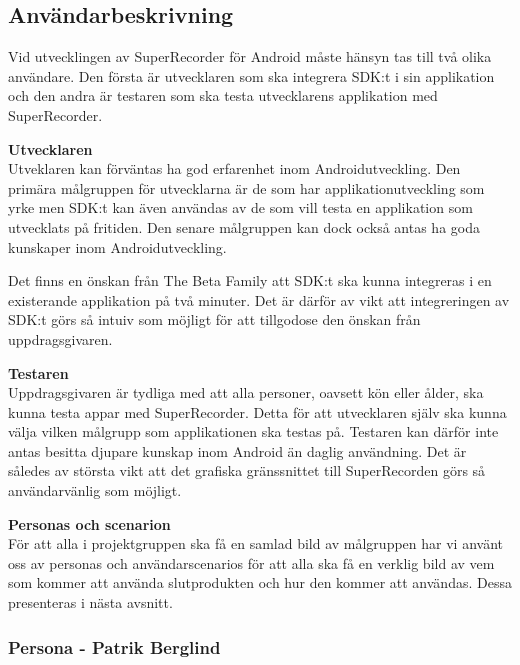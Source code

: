 \subsection{Användarbeskrivning}
\label{subsec:userdesc}

Vid utvecklingen av SuperRecorder för Android måste hänsyn tas till två olika användare. Den första är utvecklaren som ska integrera SDK:t i sin applikation och den andra är testaren som ska testa utvecklarens applikation med SuperRecorder.

\textbf{Utvecklaren} \\
Utveklaren kan förväntas ha god erfarenhet inom Androidutveckling. Den primära målgruppen för utvecklarna är de som har applikationutveckling som yrke men SDK:t kan även användas av de som vill testa en applikation som utvecklats på fritiden. Den senare målgruppen kan dock också antas ha goda kunskaper inom Androidutveckling. 

Det finns en önskan från The Beta Family att SDK:t ska kunna integreras i en existerande applikation på två minuter. Det är därför av vikt att integreringen av SDK:t görs så intuiv som möjligt för att tillgodose den önskan från uppdragsgivaren.

\textbf{Testaren} \\
Uppdragsgivaren är tydliga med att alla personer, oavsett kön eller ålder, ska kunna testa appar med SuperRecorder. Detta för att utvecklaren själv ska kunna välja vilken målgrupp som applikationen ska testas på. Testaren kan därför inte antas besitta djupare kunskap inom Android än daglig användning. Det är således av största vikt att det grafiska gränssnittet till SuperRecorden görs så användarvänlig som möjligt.

\textbf{Personas och scenarion} \\
För att alla i projektgruppen ska få en samlad bild av målgruppen har vi använt oss av personas och användarscenarios för att alla ska få en verklig bild av vem som kommer att använda slutprodukten och hur den kommer att användas. Dessa presenteras i nästa avsnitt.
\newpage	
\subsubsection{Persona - Patrik Berglind}

\vspace{40px}

